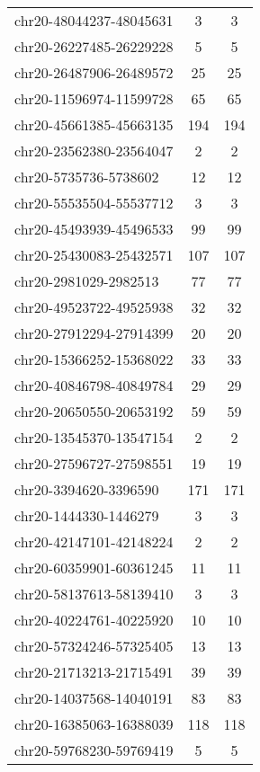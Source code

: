 \begin{longtable}{lSS}
	chr20-48044237-48045631 & 3      & 3                          \\
	chr20-26227485-26229228 & 5      & 5                          \\
	chr20-26487906-26489572 & 25     & 25                         \\
	chr20-11596974-11599728 & 65     & 65                         \\
	chr20-45661385-45663135 & 194    & 194                        \\
	chr20-23562380-23564047 & 2      & 2                          \\
	chr20-5735736-5738602   & 12     & 12                         \\
	chr20-55535504-55537712 & 3      & 3                          \\
	chr20-45493939-45496533 & 99     & 99                         \\
	chr20-25430083-25432571 & 107    & 107                        \\
	chr20-2981029-2982513   & 77     & 77                         \\
	chr20-49523722-49525938 & 32     & 32                         \\
	chr20-27912294-27914399 & 20     & 20                         \\
	chr20-15366252-15368022 & 33     & 33                         \\
	chr20-40846798-40849784 & 29     & 29                         \\
	chr20-20650550-20653192 & 59     & 59                         \\
	chr20-13545370-13547154 & 2      & 2                          \\
	chr20-27596727-27598551 & 19     & 19                         \\
	chr20-3394620-3396590   & 171    & 171                        \\
	chr20-1444330-1446279   & 3      & 3                          \\
	chr20-42147101-42148224 & 2      & 2                          \\
	chr20-60359901-60361245 & 11     & 11                         \\
	chr20-58137613-58139410 & 3      & 3                          \\
	chr20-40224761-40225920 & 10     & 10                         \\
	chr20-57324246-57325405 & 13     & 13                         \\
	chr20-21713213-21715491 & 39     & 39                         \\
	chr20-14037568-14040191 & 83     & 83                         \\
	chr20-16385063-16388039 & 118    & 118                        \\
	chr20-59768230-59769419 & 5      & 5                          \\
\end{longtable}

